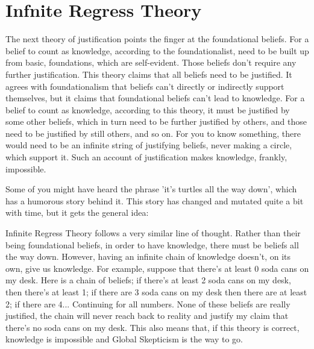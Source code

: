 \section{Infnite Regress Theory}
The next theory of justification points the finger at the foundational beliefs. For a belief to count as knowledge, according to the foundationalist, need to be built up from basic, foundations, which are self-evident. Those beliefs don't require any further justification. This theory claims that all beliefs need to be justified. It agrees with foundationalism that beliefs can't directly or indirectly support themselves, but it claims that foundational beliefs can't lead to knowledge. For a belief to count as knowledge, according to this theory, it must be justified by some other beliefs, which in turn need to be further justified by others, and those need to be justified by still others, and so on. For you to know something, there would need to be an infinite string of justifying beliefs, never making a circle, which support it. Such an account of justification makes knowledge, frankly, impossible.

Some of you might have heard the phrase 'it's turtles all the way down', which has a humorous story behind it.  This story has changed and mutated quite a bit with time, but it gets the general idea:


Infinite Regress Theory follows a very similar line of thought. Rather than their being foundational beliefs, in order to have knowledge, there must be beliefs all the way down.  However, having an infinite chain of knowledge doesn't, on its own, give us knowledge. For example, suppose that there's at least 0 soda cans on my desk. Here is a chain of beliefs; if there's at least 2 soda cans on my desk, then there's at least 1; if there are 3 soda cans on my desk then there are at least 2; if there are 4... Continuing for all numbers. None of these beliefs are really justified,  the chain will never reach back to reality and justify my claim that there's no soda cans on my desk. This also means that, if this theory is correct, knowledge is impossible and Global Skepticism is the way to go. 


